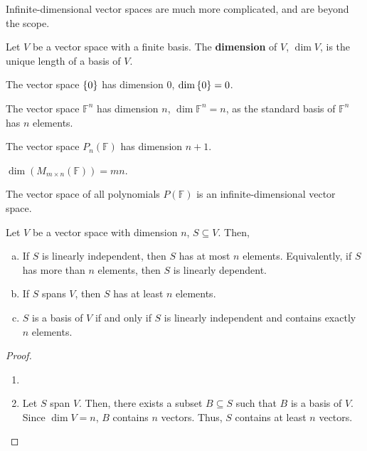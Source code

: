 \documentclass[letterpaper,12pt]{article}
\begin{document}
Infinite-dimensional vector spaces are much more complicated, and are beyond the scope.

\begin{definition}
Let $V$ be a vector space with a finite basis. The \textbf{dimension} of $V$, $\dim{V}$, is the unique length of a basis of $V$.
\end{definition}


\begin{example}
The vector space $\left\{ 0 \right\}$ has dimension $0$, $\dim{\left\{ 0 \right\}} = 0$.
\end{example}

\begin{example}
The vector space $\mathbb{F}^n$ has dimension $n$, $\dim{\mathbb{F}^n} = n$, as the standard basis of $\mathbb{F}^n$ has $n$ elements.
\end{example}

\begin{example}
The vector space $P_{n}(\mathbb{F})$ has dimension $n+1$.
\end{example}

\begin{example}
$\dim{(M_{m \times n}(\mathbb{F}))} = mn$.
\end{example}

\begin{example}
The vector space of all polynomials $P(\mathbb{F})$ is an infinite-dimensional vector space.
\end{example}

\begin{theorem}
Let $V$ be a vector space with dimension $n$, $S \subseteq V$. Then,
\begin{enumerate}[(a)]
    \item If $S$ is linearly independent, then $S$ has at most $n$ elements. Equivalently, if $S$ has more than $n$ elements, then $S$ is linearly dependent.
    \item If $S$ spans $V$, then $S$ has at least $n$ elements.
    \item $S$ is a basis of $V$ if and only if $S$ is linearly independent and contains exactly $n$ elements.
\end{enumerate}
\end{theorem}
\begin{proof}
\begin{enumerate}
    \item 
    \item Let $S$ span $V$. Then, there exists a subset $B \subseteq S$ such that $B$ is a basis of $V$. Since $\dim{V} = n$, $B$ contains $n$ vectors. Thus, $S$ contains at least $n$ vectors.
\end{enumerate}
\end{proof}
\end{document}
